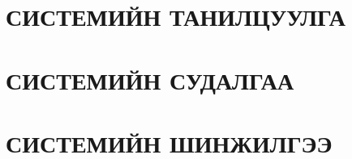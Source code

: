 \chapter{СИСТЕМИЙН ТАНИЛЦУУЛГА}


\chapter{СИСТЕМИЙН СУДАЛГАА}


\chapter{СИСТЕМИЙН ШИНЖИЛГЭЭ}


% 

% 


